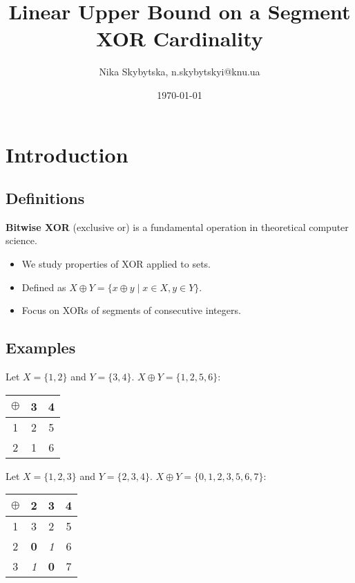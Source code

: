 \documentclass[handout,notheorems]{beamer}
\institute[KNU]{Taras Shevchenko National University of Kyiv}
\author[Skybytska N.]{Nika Skybytska, n.skybytskyi@knu.ua}
\title[Linear Upper Bound on Segment XOR]{Linear Upper Bound on a Segment XOR Cardinality}
\date{\today}
\theoremstyle{definition}
\begin{document}
\begin{frame}
    \titlepage
\end{frame}

\section{Introduction}

\subsection{Definitions}

\begin{frame}
    \textbf{Bitwise XOR} (exclusive or) is a fundamental operation in theoretical computer science.
    \begin{itemize}
        \item We study properties of XOR applied to sets.
        \item Defined as $X \oplus Y = \{ x \oplus y \mid x \in X, y \in Y \}$.
        \item Focus on XORs of segments of consecutive integers.
    \end{itemize}
\end{frame}

\subsection{Examples}

\begin{frame}
    Let $X = \{1, 2\}$ and $Y = \{3, 4\}$. $X \oplus Y = \{1, 2, 5, 6\}$:
    \begin{table}
        \begin{tabular}{c|cc}
            $\oplus$ & 3 & 4 \\ \hline
            1 & 2 & 5 \\
            2 & 1 & 6 \\
        \end{tabular}
    \end{table}
    \pause
    Let $X = \{1, 2, 3\}$ and $Y = \{2, 3, 4\}$. $X \oplus Y = \{0, 1, 2, 3, 5, 6, 7\}$:
    \begin{table}
        \begin{tabular}{c|ccc}
            $\oplus$ & 2 & 3 & 4 \\ \hline
            1 & 3 & 2 & 5 \\
            2 & \textbf{0} & \textit{1} & 6 \\
            3 & \textit{1} & \textbf{0} & 7 
        \end{tabular}
    \end{table}
\end{frame}
\end{document}

